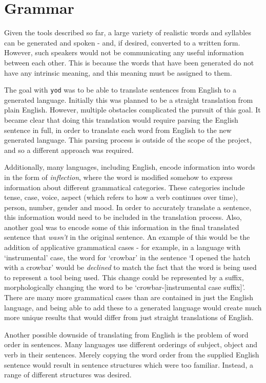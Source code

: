 \documentclass{report}
\begin{document}
	\chapter{Grammar}
	\label{chapter: grammar}
	
	Given the tools described so far, a large variety of realistic words and syllables can be generated and spoken - and, if desired, converted to a written form. However, such speakers would not be communicating any useful information between each other. This is because the words that have been generated do not have any intrinsic meaning, and this meaning must be assigned to them.
	
	The goal with \texttt{yod} was to be able to translate sentences from English to a generated language. Initially this was planned to be a straight translation from plain English. However, multiple obstacles complicated the pursuit of this goal. It became clear that doing this translation would require parsing the English sentence in full, in order to translate each word from English to the new generated language. This parsing process is outside of the scope of the project, and so a different approach was required.
	
	Additionally, many languages, including English, encode information into words in the form of \textit{inflection}, where the word is modified somehow to express information about different grammatical categories. These categories include tense, case, voice, aspect (which refers to how a verb continues over time), person, number, gender and mood. In order to accurately translate a sentence, this information would need to be included in the translation process. Also, another goal was to encode some of this information in the final translated sentence that \textit{wasn't} in the original sentence. An example of this would be the addition of applicative grammatical cases - for example, in a language with `instrumental' case, the word for `crowbar' in the sentence `I opened the hatch with a crowbar' would be \textit{declined} to match the fact that the word is being used to represent a tool being used. This change could be represented by a suffix, morphologically changing the word to be `crowbar-[instrumental case suffix]'. There are many more grammatical cases than are contained in just the English language, and being able to add these to a generated language would create much more unique results that would differ from just straight translations of English.
	
	Another possible downside of translating from English is the problem of word order in sentences. Many languages use different orderings of subject, object and verb in their sentences\cite{wals-81}. Merely copying the word order from the supplied English sentence would result in sentence structures which were too familiar. Instead, a range of different structures was desired.
	
\end{document}
